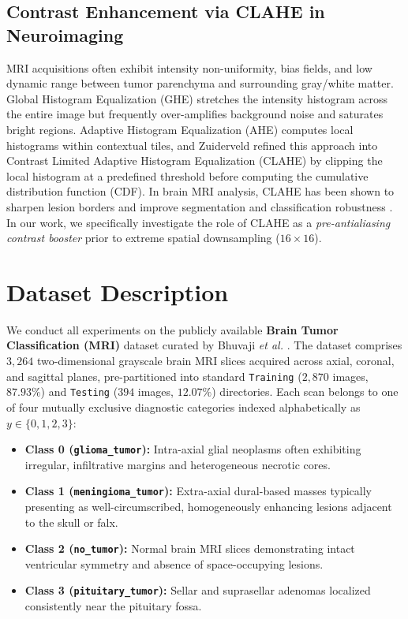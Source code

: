 \documentclass[conference]{IEEEtran}
\begin{document}
\subsection{Contrast Enhancement via CLAHE in Neuroimaging}
MRI acquisitions often exhibit intensity non-uniformity, bias fields, and low dynamic range between tumor parenchyma and surrounding gray/white matter. Global Histogram Equalization (GHE) stretches the intensity histogram across the entire image but frequently over-amplifies background noise and saturates bright regions. Adaptive Histogram Equalization (AHE) \cite{pizer1987adaptive} computes local histograms within contextual tiles, and Zuiderveld \cite{zuiderveld1994contrast} refined this approach into Contrast Limited Adaptive Histogram Equalization (CLAHE) by clipping the local histogram at a predefined threshold before computing the cumulative distribution function (CDF). In brain MRI analysis, CLAHE has been shown to sharpen lesion borders and improve segmentation and classification robustness \cite{kaur2018comparison}. In our work, we specifically investigate the role of CLAHE as a \emph{pre-antialiasing contrast booster} prior to extreme spatial downsampling ($16 \times 16$).



\section{Dataset Description}
We conduct all experiments on the publicly available \textbf{Brain Tumor Classification (MRI)} dataset curated by Bhuvaji \emph{et al.} \cite{bhuvaji2020brain}. The dataset comprises $3,264$ two-dimensional grayscale brain MRI slices acquired across axial, coronal, and sagittal planes, pre-partitioned into standard \texttt{Training} ($2,870$ images, $87.93\%$) and \texttt{Testing} ($394$ images, $12.07\%$) directories. Each scan belongs to one of four mutually exclusive diagnostic categories indexed alphabetically as $y \in \{0, 1, 2, 3\}$:
\begin{itemize}
    \item \textbf{Class 0 (\texttt{glioma\_tumor}):} Intra-axial glial neoplasms often exhibiting irregular, infiltrative margins and heterogeneous necrotic cores.
    \item \textbf{Class 1 (\texttt{meningioma\_tumor}):} Extra-axial dural-based masses typically presenting as well-circumscribed, homogeneously enhancing lesions adjacent to the skull or falx.
    \item \textbf{Class 2 (\texttt{no\_tumor}):} Normal brain MRI slices demonstrating intact ventricular symmetry and absence of space-occupying lesions.
    \item \textbf{Class 3 (\texttt{pituitary\_tumor}):} Sellar and suprasellar adenomas localized consistently near the pituitary fossa.
\end{itemize}
\end{document}
